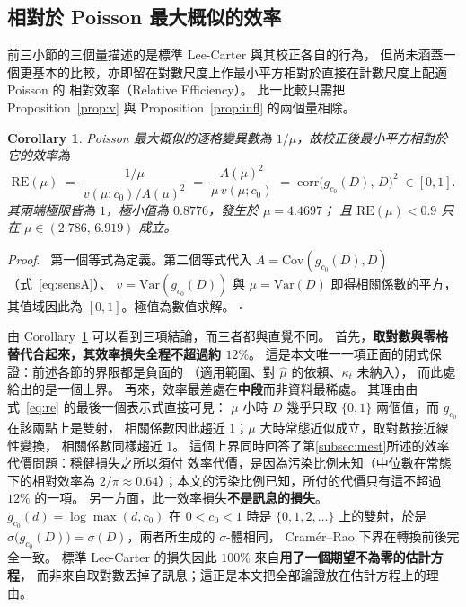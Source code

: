 \documentclass[UTF8, fontset=macnew, a4paper, 12pt]{ctexart}
\newtheorem{cor}{Corollary}
\newenvironment{proof}{\par\noindent\textit{Proof}.\ }{\hfill$\square$\par\vspace{4pt}}
\begin{document}
\subsection{相對於 Poisson 最大概似的效率}\label{subsec:releff}\label{subsec:secsum}\label{subsec:asym}

前三小節的三個量描述的是標準 Lee-Carter 與其校正各自的行為，
但尚未涵蓋一個更基本的比較，亦即留在對數尺度上作最小平方相對於直接在計數尺度上配適 Poisson 的
相對效率（Relative Efficiency）。
此一比較只需把 Proposition~\ref{prop:v} 與
Proposition~\ref{prop:infl} 的兩個量相除。

\begin{cor}\label{cor:re}
Poisson 最大概似的逐格變異數為 $1/\mu$，故校正後最小平方相對於它的效率為
\begin{equation}\label{eq:re}
\mathrm{RE}(\mu)\;=\;\frac{1/\mu}{v(\mu;c_0)/A(\mu)^2}
\;=\;\frac{A(\mu)^2}{\mu\,v(\mu;c_0)}
\;=\;\mathrm{corr}\bigl(g_{c_0}(D),\,D\bigr)^{2}\;\in[0,1].
\end{equation}
其兩端極限皆為 $1$，極小值為 $0.8776$，發生於 $\mu=4.4697$；
且 $\mathrm{RE}(\mu)<0.9$ 只在 $\mu\in(2.786,\,6.919)$ 成立。
\end{cor}

\begin{proof}
第一個等式為定義。第二個等式代入
$A=\mathrm{Cov}(g_{c_0}(D),D)$（式~\eqref{eq:sensA}）、
$v=\mathrm{Var}(g_{c_0}(D))$ 與 $\mu=\mathrm{Var}(D)$ 即得相關係數的平方，
其值域因此為 $[0,1]$。極值為數值求解。
\end{proof}

由 Corollary~\ref{cor:re} 可以看到三項結論，而三者都與直覺不同。
首先，\textbf{取對數與零格替代合起來，其效率損失全程不超過約 $12\%$}。
這是本文唯一一項正面的閉式保證：前述各節的界限都是負面的
（適用範圍、對 $\hat\mu$ 的依賴、$\kappa_t$ 未納入），
而此處給出的是一個上界。
再來，效率最差處在\textbf{中段}而非資料最稀處。
其理由由式~\eqref{eq:re} 的最後一個表示式直接可見：
$\mu$ 小時 $D$ 幾乎只取 $\{0,1\}$ 兩個值，而 $g_{c_0}$ 在該兩點上是雙射，
相關係數因此趨近 $1$；$\mu$ 大時常態近似成立，取對數接近線性變換，
相關係數同樣趨近 $1$。
這個上界同時回答了第\ref{subsec:mest}所述的效率代價問題：穩健損失之所以須付
效率代價，是因為污染比例未知（中位數在常態下的相對效率為
$2/\pi\approx0.64$）；本文的污染比例已知，所付的代價只有這不超過
$12\%$ 的一項。
另一方面，此一效率損失\textbf{不是訊息的損失}。$g_{c_0}(d)=\log\max(d,c_0)$
在 $0<c_0<1$ 時是 $\{0,1,2,\dots\}$ 上的雙射，於是
$\sigma\bigl(g_{c_0}(D)\bigr)=\sigma(D)$，兩者所生成的 $\sigma$-體相同，
Cramér--Rao 下界在轉換前後完全一致。
標準 Lee-Carter 的損失因此 $100\%$ 來自\textbf{用了一個期望不為零的估計方程}，
而非來自取對數丟掉了訊息；這正是本文把全部論證放在估計方程上的理由。
\end{document}
